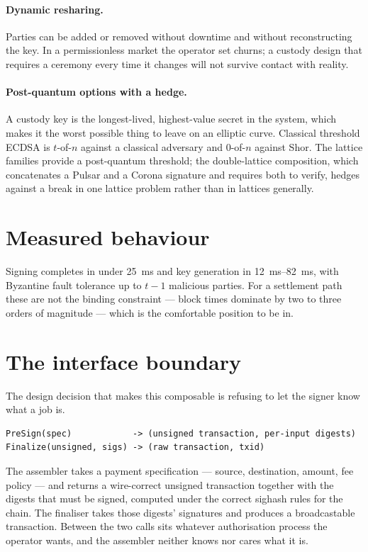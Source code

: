 \documentclass[11pt,a4paper]{article}
\begin{document}
\paragraph{Dynamic resharing.} Parties can be added or removed without downtime
and without reconstructing the key. In a permissionless market the operator set
churns; a custody design that requires a ceremony every time it changes will not
survive contact with reality.

\paragraph{Post-quantum options with a hedge.} A custody key is the longest-lived,
highest-value secret in the system, which makes it the worst possible thing to
leave on an elliptic curve. Classical threshold ECDSA is $t$-of-$n$ against a
classical adversary and $0$-of-$n$ against Shor. The lattice families provide a
post-quantum threshold; the double-lattice composition, which concatenates a
Pulsar and a Corona signature and requires both to verify, hedges against a break
in one lattice problem rather than in lattices generally.

\section{Measured behaviour}

Signing completes in under \SI{25}{\milli\second} and key generation in
\SIrange{12}{82}{\milli\second}, with Byzantine fault tolerance up to $t-1$
malicious parties. For a settlement path these are not the binding constraint ---
block times dominate by two to three orders of magnitude --- which is the
comfortable position to be in.

\section{The interface boundary}

The design decision that makes this composable is refusing to let the signer know
what a job is.

\begin{lstlisting}
PreSign(spec)            -> (unsigned transaction, per-input digests)
Finalize(unsigned, sigs) -> (raw transaction, txid)
\end{lstlisting}

The assembler takes a payment specification --- source, destination, amount, fee
policy --- and returns a wire-correct unsigned transaction together with the
digests that must be signed, computed under the correct sighash rules for the
chain. The finaliser takes those digests' signatures and produces a
broadcastable transaction. Between the two calls sits whatever authorisation
process the operator wants, and the assembler neither knows nor cares what it is.
\end{document}
